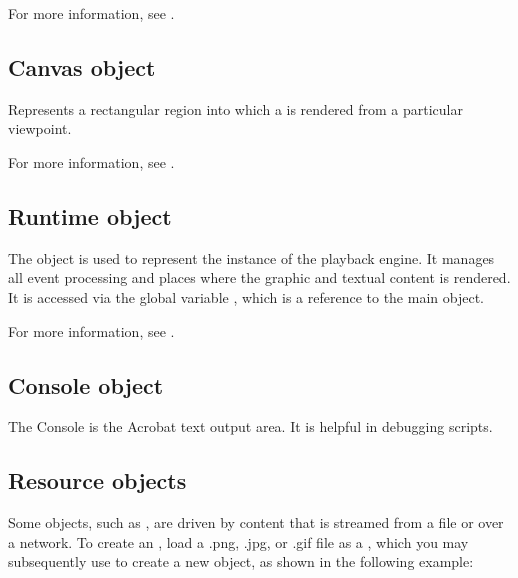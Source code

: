 \documentclass[letterpaper,12pt,english,openany,oneside]{sphinxmanual}
\begin{document}
For more information, see .


\subsection{Canvas object}
\label{\detokenize{index:canvas-object}}
Represents a rectangular region into which a  is rendered from a particular viewpoint.

For more information, see .


\subsection{Runtime object}
\label{\detokenize{index:runtime-object}}
The  object is used to represent the instance of the playback engine. It manages all event processing and places where the graphic and textual content is rendered. It is accessed via the global variable  , which is a reference to the main  object.

For more information, see .


\subsection{Console object}
\label{\detokenize{index:console-object}}
The Console is the Acrobat text output area. It is helpful in debugging scripts.


\subsection{Resource objects}
\label{\detokenize{index:resource-objects}}
Some objects, such as  , are driven by content that is streamed from a file or over a network. To create an  , load a .png, .jpg, or .gif file as a  , which you may subsequently use to create a new  object, as shown in the following example:

\begin{sphinxVerbatim}[commandchars=\\\{\}]
   
      
   
   
\end{sphinxVerbatim}
\end{document}
